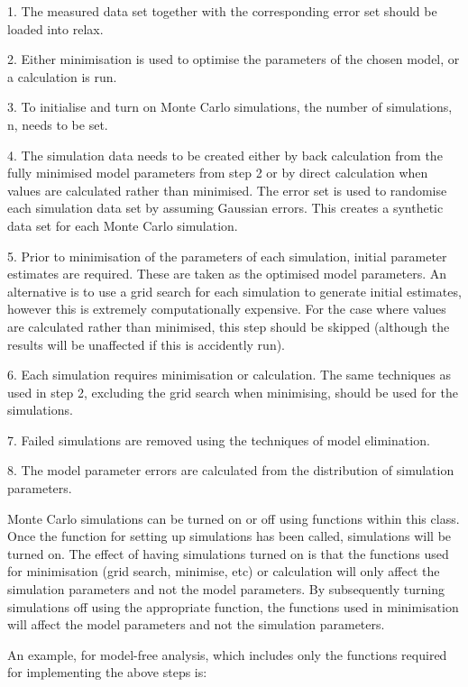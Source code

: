 1.  The measured data set together with the corresponding error set should be loaded into
relax.

2.  Either minimisation is used to optimise the parameters of the chosen model, or a
calculation is run.

3.  To initialise and turn on Monte Carlo simulations, the number of simulations, n, needs
to be set.

4.  The simulation data needs to be created either by back calculation from the fully
minimised model parameters from step 2 or by direct calculation when values are calculated
rather than minimised.  The error set is used to randomise each simulation data set by
assuming Gaussian errors.  This creates a synthetic data set for each Monte Carlo
simulation.

5.  Prior to minimisation of the parameters of each simulation, initial parameter estimates
are required.  These are taken as the optimised model parameters.  An alternative is to use
a grid search for each simulation to generate initial estimates, however this is extremely
computationally expensive.  For the case where values are calculated rather than minimised,
this step should be skipped (although the results will be unaffected if this is accidently
run).

6.  Each simulation requires minimisation or calculation.  The same techniques as used in
step 2, excluding the grid search when minimising, should be used for the simulations.

7.  Failed simulations are removed using the techniques of model elimination.

8.  The model parameter errors are calculated from the distribution of simulation
parameters.


Monte Carlo simulations can be turned on or off using functions within this class.  Once the
function for setting up simulations has been called, simulations will be turned on.  The
effect of having simulations turned on is that the functions used for minimisation (grid
search, minimise, etc) or calculation will only affect the simulation parameters and not the
model parameters.  By subsequently turning simulations off using the appropriate function,
the functions used in minimisation will affect the model parameters and not the simulation
parameters.


An example, for model-free analysis, which includes only the functions required for
implementing the above steps is:


